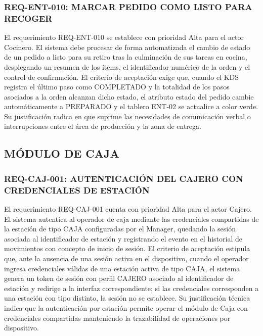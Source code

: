 \subsubsection{REQ-ENT-010: MARCAR PEDIDO COMO LISTO PARA RECOGER}
El requerimiento REQ-ENT-010 se establece con prioridad Alta para el actor Cocinero. El sistema debe procesar de forma automatizada el cambio de estado de un pedido a listo para su retiro tras la culminación de sus tareas en cocina, desplegando un resumen de los ítems, el identificador numérico de la orden y el control de confirmación. El criterio de aceptación exige que, cuando el KDS registra el último paso como COMPLETADO y la totalidad de los pasos asociados a la orden alcanzan dicho estado, el atributo estado del pedido cambie automáticamente a PREPARADO y el tablero ENT-02 se actualice a color verde. Su justificación radica en que suprime las necesidades de comunicación verbal o interrupciones entre el área de producción y la zona de entrega.

\subsection{MÓDULO DE CAJA}

\subsubsection{REQ-CAJ-001: AUTENTICACIÓN DEL CAJERO CON CREDENCIALES DE ESTACIÓN}
El requerimiento REQ-CAJ-001 cuenta con prioridad Alta para el actor Cajero. El sistema autentica al operador de caja mediante las credenciales compartidas de la estación de tipo CAJA configuradas por el Manager, quedando la sesión asociada al identificador de estación y registrando el evento en el historial de movimientos con concepto de inicio de sesión. El criterio de aceptación estipula que, ante la ausencia de una sesión activa en el dispositivo, cuando el operador ingresa credenciales válidas de una estación activa de tipo CAJA, el sistema genera un token de sesión con perfil CAJERO asociado al identificador de estación y redirige a la interfaz correspondiente; si las credenciales corresponden a una estación con tipo distinto, la sesión no se establece. Su justificación técnica indica que la autenticación por estación permite operar el módulo de Caja con credenciales compartidas manteniendo la trazabilidad de operaciones por dispositivo.

